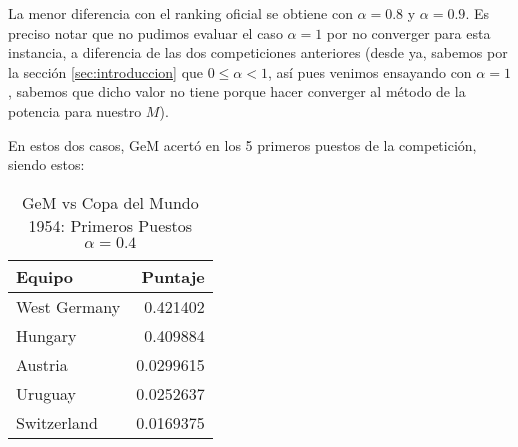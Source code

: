 \begin{enumerate}
        \par La menor diferencia con el ranking oficial se obtiene con
        $\alpha=0.8$ y $\alpha=0.9$. Es preciso notar que no pudimos evaluar el
        caso $\alpha=1$ por no converger para esta instancia, a diferencia de
        las dos competiciones anteriores (desde ya, sabemos por la secci\'on
        \ref{sec:introduccion} que $0\leq\alpha <1$, as\'i pues venimos
        ensayando con $\alpha=1$, sabemos que dicho valor no tiene porque hacer
        converger al m\'etodo de la potencia para nuestro $M$).

        \par En estos dos casos, GeM acertó en los 5 primeros puestos de la
        competición, siendo estos:
        \begin{table}[!h]
            \centering
            \caption{GeM vs Copa del Mundo 1954: Primeros Puestos $\alpha=0.4$}
            \setlength{\tabcolsep}{3pt}
            \begin{tabular}{|l|r|}
                \hline\hline
                Equipo & Puntaje\\
                \hline
                West Germany &0.421402\\
                Hungary &0.409884\\
                Austria &0.0299615\\
                Uruguay &0.0252637\\
                Switzerland &0.0169375\\
                \hline\hline
            \end{tabular}
        \end{table}
\end{enumerate}

